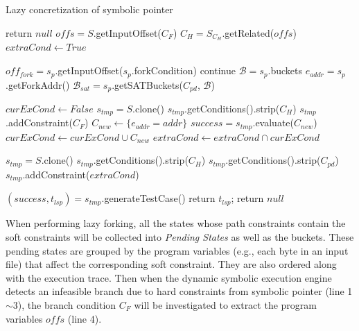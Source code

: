 \documentclass{cta-author}
\begin{document}
\begin{algorithm}
	\LinesNumbered
	\caption{Lazy concretization of symbolic pointer}
	\label{LCSP}
	{
		return $null$\;
	}
	$offs = S$.getInputOffset($C_F$)\;
	$C_H = S_{C_H}$.getRelated($offs$)\;
	$extraCond\leftarrow True$\;
	{
		$off_{fork} = s_p$.getInputOffset($s_p$.forkCondition)\;
		{continue\;}
		$\mathcal{B}=s_p$.buckets\;
		$e_{addr} = s_p$.getForkAddr()\;
		$\mathcal{B}_{sat}=s_p$.getSATBuckets($C_{pd}$, $\mathcal{B}$)\;
		
		$curExCond\leftarrow False$\;
		{
			{
				$s_{tmp} = S$.clone()\;
				$s_{tmp}$.getConditions().strip($C_H$)\;
				$s_{tmp}$.addConstraint($C_F$)\;
				$C_{new}\leftarrow \{e_{addr}=addr\}$\;
				$success = s_{tmp}$.evaluate($C_{new}$)\;
				{$curExCond\leftarrow curExCond\cup C_{new}$\;}
			}
		}
		$extraCond\leftarrow extraCond\cap curExCond$\;
	}
	
	$s_{tmp} = S$.clone()\;
	$s_{tmp}$.getConditions().strip($C_H$)\;
	$s_{tmp}$.getConditions().strip($C_{pd}$)\;
	$s_{tmp}$.addConstraint($extraCond$)\;
	
	$(success, t_{lsp}) = s_{tmp}$.generateTestCase()\;
	{
		return $t_{lsp}$;
	}
	return $null$\;
\end{algorithm}

When performing lazy forking, all the states whose path constraints 
contain the soft constraints will be collected into \emph{Pending States}
as well as the buckets. 
These pending states are grouped by the program variables (e.g., each 
byte in an input file) that affect the corresponding soft constraint. 
They are also ordered along with the execution trace.
Then when the dynamic symbolic execution engine detects an infeasible 
branch due to hard constraints from symbolic pointer (line 1$\sim$3), 
the branch condition $C_F$ will be 
investigated to extract the program variables $offs$ (line 4).
\end{document}
